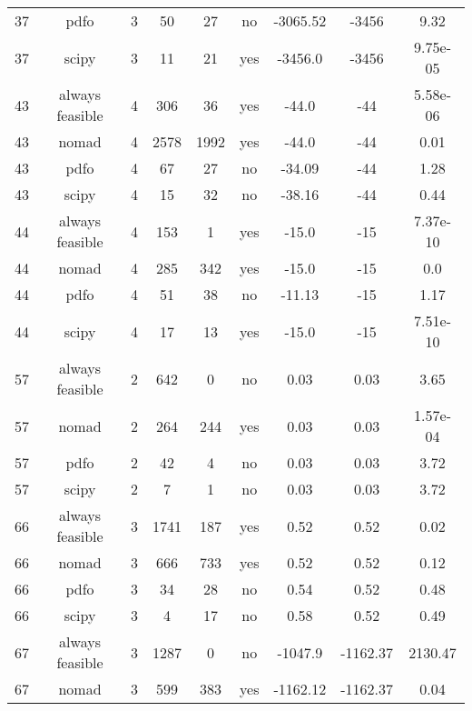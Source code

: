 \begin{footnotesize}
\begin{center}
\begin{longtable}{ccccccccc}
 37 &            pdfo &  3 &     50 &     27 &      no &    -3065.52 &       -3456 &     9.32\\
 37 &           scipy &  3 &     11 &     21 &     yes &     -3456.0 &       -3456 & 9.75e-05\\
 43 & always feasible &  4 &    306 &     36 &     yes &       -44.0 &         -44 & 5.58e-06\\
 43 &           nomad &  4 &   2578 &   1992 &     yes &       -44.0 &         -44 &     0.01\\
 43 &            pdfo &  4 &     67 &     27 &      no &      -34.09 &         -44 &     1.28\\
 43 &           scipy &  4 &     15 &     32 &      no &      -38.16 &         -44 &     0.44\\
 44 & always feasible &  4 &    153 &      1 &     yes &       -15.0 &         -15 & 7.37e-10\\
 44 &           nomad &  4 &    285 &    342 &     yes &       -15.0 &         -15 &      0.0\\
 44 &            pdfo &  4 &     51 &     38 &      no &      -11.13 &         -15 &     1.17\\
 44 &           scipy &  4 &     17 &     13 &     yes &       -15.0 &         -15 & 7.51e-10\\
 57 & always feasible &  2 &    642 &      0 &      no &        0.03 &        0.03 &     3.65\\
 57 &           nomad &  2 &    264 &    244 &     yes &        0.03 &        0.03 & 1.57e-04\\
 57 &            pdfo &  2 &     42 &      4 &      no &        0.03 &        0.03 &     3.72\\
 57 &           scipy &  2 &      7 &      1 &      no &        0.03 &        0.03 &     3.72\\
 66 & always feasible &  3 &   1741 &    187 &     yes &        0.52 &        0.52 &     0.02\\
 66 &           nomad &  3 &    666 &    733 &     yes &        0.52 &        0.52 &     0.12\\
 66 &            pdfo &  3 &     34 &     28 &      no &        0.54 &        0.52 &     0.48\\
 66 &           scipy &  3 &      4 &     17 &      no &        0.58 &        0.52 &     0.49\\
 67 & always feasible &  3 &   1287 &      0 &      no &     -1047.9 &    -1162.37 &  2130.47\\
 67 &           nomad &  3 &    599 &    383 &     yes &    -1162.12 &    -1162.37 &     0.04\\

\end{longtable}
\end{center}
\end{footnotesize}
